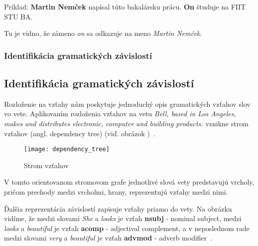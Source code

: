 Príklad:
\textbf{Martin Nemček} napísal túto bakalársku prácu. \textbf{On} študuje na FIIT STU BA.

Tu je vidno, že zámeno \textit{on} sa odkazuje na meno \textit{Martin Nemček}.

%
%
{
	\subsubsection{Identifikácia gramatických závislostí}
}
{
	\subsection{Identifikácia gramatických závislostí}
}
\label{subsubsec:dependencyparsing}
Rozloženie na vzťahy nám poskytuje jednoduchý opis gramatických vzťahov slov vo vete. Aplikovaním rozloženia vzťahov na vetu \textit{Bell, based in Los
Angeles, makes and distributes electronic, computer and building products.
} vznikne strom vzťahov (angl. dependency tree) (viď. obrázok )~\cite{StanfordDepManual}.

\begin{figure}[H]
\begin{center}\texttt{[image: dependency\_tree]}\end{center}
\caption[Strom vzťahov]{Strom vzťahov}\label{fig:dependency_tree}
\end{figure}

V tomto orientovanom stromovom grafe jednotlivé slová vety predstavujú vrcholy, pričom prechody medzi vrcholmi, hrany, reprezentujú vzťahy medzi nimi.

Ďalšia reprezentácia závislostí zapisuje vzťahy priamo do vety. Na obrázku  vidíme, že medzi slovami \textit{She} a \textit{looks} je vzťah \textbf{nsubj} - nominal subject, medzi \textit{looks} a \textit{beautiful} je vzťah \textbf{acomp} - adjectival complement, a v neposlednom rade medzi slovami \textit{very} a \textit{beautiful} je vzťah \textbf{advmod} - adverb modifier~\cite{StanfordDepManual}.

